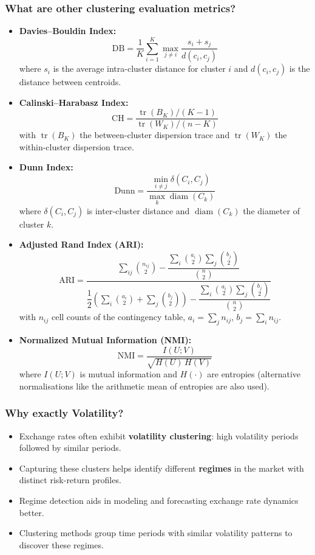 \begin{frame}
    \frametitle{What are other clustering evaluation metrics?}
    \tiny{
    \begin{itemize}
        \item \textbf{Davies--Bouldin Index:}
        \[
            \mathrm{DB}=\frac{1}{K}\sum_{i=1}^K \max_{j\neq i}\frac{s_i+s_j}{d(c_i,c_j)}
        \]
        where \(s_i\) is the average intra-cluster distance for cluster \(i\) and \(d(c_i,c_j)\) is the distance between centroids.
        \item \textbf{Calinski--Harabasz Index:}
        \[
            \mathrm{CH}=\frac{\operatorname{tr}(B_K)/(K-1)}{\operatorname{tr}(W_K)/(n-K)}
        \]
        with \(\operatorname{tr}(B_K)\) the between-cluster dispersion trace and \(\operatorname{tr}(W_K)\) the within-cluster dispersion trace.
        \item \textbf{Dunn Index:}
        \[
            \mathrm{Dunn}=\frac{\min_{i\neq j}\delta(C_i,C_j)}{\max_k\operatorname{diam}(C_k)}
        \]
        where \(\delta(C_i,C_j)\) is inter-cluster distance and \(\operatorname{diam}(C_k)\) the diameter of cluster \(k\).
        \item \textbf{Adjusted Rand Index (ARI):}
        \[
            \mathrm{ARI}=\frac{\sum_{ij}\binom{n_{ij}}{2}-\dfrac{\sum_i\binom{a_i}{2}\sum_j\binom{b_j}{2}}{\binom{n}{2}}}
            {\dfrac{1}{2}\left(\sum_i\binom{a_i}{2}+\sum_j\binom{b_j}{2}\right)-\dfrac{\sum_i\binom{a_i}{2}\sum_j\binom{b_j}{2}}{\binom{n}{2}}}
        \]
        with \(n_{ij}\) cell counts of the contingency table, \(a_i=\sum_j n_{ij}\), \(b_j=\sum_i n_{ij}\).
        \item \textbf{Normalized Mutual Information (NMI):}
        \[
            \mathrm{NMI}=\frac{I(U;V)}{\sqrt{H(U)\,H(V)}}
        \]
        where \(I(U;V)\) is mutual information and \(H(\cdot)\) are entropies (alternative normalisations like the arithmetic mean of entropies are also used).
    \end{itemize}
    }
\end{frame}
\begin{frame}
    \frametitle{Why exactly Volatility?}
    \scriptsize{
        \begin{itemize}
            \item Exchange rates often exhibit \textbf{volatility clustering}: high volatility periods followed by similar periods.
            \item Capturing these clusters helps identify different \textbf{regimes} in the market with distinct risk-return profiles.
            \item Regime detection aids in modeling and forecasting exchange rate dynamics better.
            \item Clustering methods group time periods with similar volatility patterns to discover these regimes.
        \end{itemize}
    }
\end{frame}
